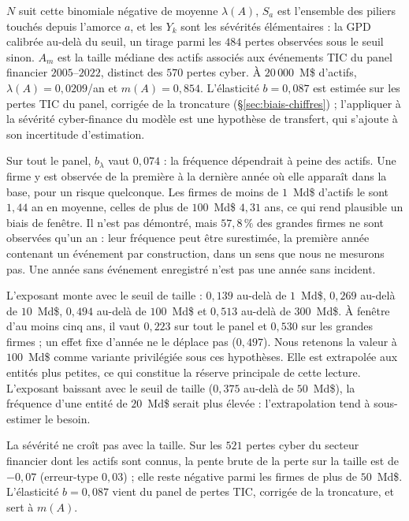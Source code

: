 $N$ suit cette binomiale négative de moyenne $\lambda(A)$, $S_a$ est
l'ensemble des piliers touchés depuis l'amorce $a$, et les $Y_k$ sont les sévérités élémentaires : la GPD
calibrée au-delà du seuil, un tirage parmi les $484$ pertes observées sous le seuil sinon. $A_m$ est la taille
médiane des actifs associés aux événements TIC du panel financier $2005$--$2022$, distinct des
$570$ pertes cyber. À $20\,000$~M\$ d'actifs, $\lambda(A)=0{,}0209$/an et $m(A)=0{,}854$.
L'élasticité $b=0{,}087$ est estimée sur les pertes TIC du panel, corrigée de la troncature
(\S\ref{sec:biais-chiffres}) ; l'appliquer à la sévérité cyber-finance du modèle est une hypothèse de
transfert, qui s'ajoute à son incertitude d'estimation.

Sur tout le panel, $b_\lambda$ vaut $0{,}074$ : la fréquence dépendrait à peine des actifs. Une firme y
est observée de la première à la dernière année où elle apparaît dans la base, pour un risque quelconque.
Les firmes de moins de $1$~Md\$ d'actifs le sont $1{,}44$ an en moyenne, celles de plus de $100$~Md\$
$4{,}31$ ans, ce qui rend plausible un biais de fenêtre. Il n'est pas démontré, mais $57{,}8\,\%$ des grandes
firmes ne sont observées qu'un an : leur fréquence peut être surestimée, la première année contenant un
événement par construction, dans un sens que nous ne mesurons pas. Une année sans événement enregistré
n'est pas une année sans incident.

L'exposant monte avec le seuil de taille : $0{,}139$ au-delà de $1$~Md\$, $0{,}269$ au-delà de $10$~Md\$,
$0{,}494$ au-delà de $100$~Md\$ et $0{,}513$ au-delà de $300$~Md\$. À fenêtre d'au moins cinq ans, il vaut
$0{,}223$ sur tout le panel et $0{,}530$ sur les grandes firmes ; un effet fixe d'année ne le déplace pas
($0{,}497$). Nous retenons la valeur à $100$~Md\$ comme variante privilégiée sous ces hypothèses. Elle est
extrapolée aux entités plus petites, ce qui constitue la réserve principale de cette lecture. L'exposant baissant
avec le seuil de taille ($0{,}375$ au-delà de $50$~Md\$), la fréquence d'une entité de $20$~Md\$ serait plus
élevée : l'extrapolation tend à sous-estimer le besoin.

La sévérité ne croît pas avec la taille. Sur les $521$ pertes cyber du secteur financier dont les
actifs sont connus, la pente brute de la perte sur la taille est de $-0{,}07$ (erreur-type $0{,}03$) ;
elle reste négative parmi les firmes de plus de $50$~Md\$. L'élasticité $b=0{,}087$ vient du panel de pertes TIC, corrigée de la troncature, et sert à $m(A)$.

